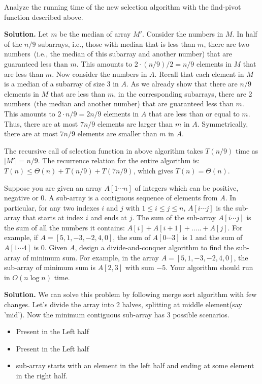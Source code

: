 \documentclass[11pt]{article}
\begin{document}
\begin{qunlist}
Analyze the running time of the new selection algorithm with the find-pivot
function described above.

{\bf Solution.}
Let $m$ be the median of array $M'$. 
Consider the numbers in $M$. 
In half of the $n/9$ subarrays, i.e., those with median that is less than $m$,
there are two numbers~(i.e., the median of this subarray and another number)
that are guaranteed less than $m$.
This amounts to $2 \cdot (n/9)/2 = n/9$ elements in $M$ that are less than $m$. 
Now consider the numbers in $A$.
Recall that each element in $M$ is a median of a subarray of size 3 in $A$. 
As we already show that there are $n/9$ elements in $M$ that are less than $m$,
in the corresponding subarrays, there are 2 numbers~(the median and another number)
that are guaranteed less than $m$. This amounts to $2 \cdot n/9 = 2n/9$ elements in
$A$ that are less than or equal to $m$. Thus, there are at most $7n/9$ elements are
larger than $m$ in $A$. Symmetrically, there are at most $7n/9$ elements are smaller than $m$
in $A$. 

The recursive call of selection function in above algorithm takes $T(n/9)$ time
as $|M'| = n/9$. The recurrence relation for the entire algorithm
is: $T(n) \leq \Theta(n) + T(n/9) + T(7n/9)$, which gives $T(n) = \Theta(n)$.

Suppose you are given an array $A[1\cdots n]$ of integers which can be
positive, negative or 0. A sub-array is a contiguous sequence of elements from
$A$. In particular, for any two indexes $i$ and $j$ with $1 \leq i \leq j \leq n$,
$A[i\cdots j]$ is the sub-array that starts at index $i$ and ends at $j$.
The sum of the sub-array $A[i\cdots j]$ is the sum of all the numbers it
contains: $A[i] + A[i + 1] + ..... + A[j]$. For example, 
if $A = [5, 1, -3, -2, 4, 0]$, the sum of $A[0\cdots 3]$ is 1 and the sum of $A[1\cdots 4]$ is 0.
Given $A$, design a divide-and-conquer algorithm to find the sub-array of minimum sum. For example, in the array $A = [5, 1, -3, -2, 4, 0]$, the
sub-array of minimum sum is $A[2, 3]$ with sum $-5$. Your algorithm should run in $O(n\log n)$ time.

{\bf Solution.} We can solve this problem by following merge sort algorithm with few changes. Let's divide the array into 2 halves, splitting at middle element(say 'mid'). Now the minimum contiguous sub-array has 3 possible scenarios.
\begin{itemize}
    \item Present in the Left half
    \item Present in the Left half
    \item sub-array starts with an element in the left half and ending at some element in the right half.
\end{itemize}


\end{qunlist}
\end{document}
